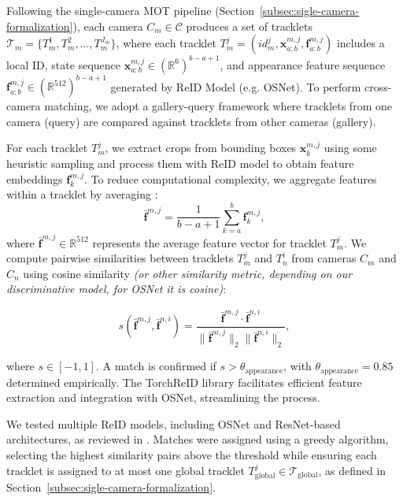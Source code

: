 \documentclass[12pt, a4paper]{article}
\begin{document}
Following the single-camera MOT pipeline (Section~\ref{subsec:sigle-camera-formalization}), each camera $C_m \in \mathcal{C}$ produces a set of tracklets $\mathcal{T}_m = \{ T_m^1, T_m^2, \ldots, T_m^{J_m} \}$, where each tracklet $T_m^j = (id_m^j, \mathbf{x}_{a:b}^{m,j}, \mathbf{f}_{a:b}^{m,j})$ includes a local ID, state sequence $\mathbf{x}_{a:b}^{m,j} \in (\mathbb{R}^6)^{b-a+1}$, and appearance feature sequence $\mathbf{f}_{a:b}^{m,j} \in (\mathbb{R}^{512})^{b-a+1}$ generated by ReID Model (e.g. OSNet). To perform cross-camera matching, we adopt a gallery-query framework where tracklets from one camera (query) are compared against tracklets from other cameras (gallery).

For each tracklet $T_m^j$, we extract crops from bounding boxes $\mathbf{x}_k^{m,j}$ using some heuristic sampling and process them with ReID model to obtain feature embeddings $\mathbf{f}_k^{m,j}$. To reduce computational complexity, we aggregate features within a tracklet by averaging \cite{Specker-ReID}:
\begin{equation}
\bar{\mathbf{f}}^{m,j} = \frac{1}{b-a+1} \sum_{k=a}^b \mathbf{f}_k^{m,j},
\end{equation}
where $\bar{\mathbf{f}}^{m,j} \in \mathbb{R}^{512}$ represents the average feature vector for tracklet $T_m^j$. We compute pairwise similarities between tracklets $T_m^j$ and $T_n^i$ from cameras $C_m$ and $C_n$ using cosine similarity \textit{(or other similarity metric, depending on our discriminative model, for OSNet it is cosine)}:

\begin{equation}
s(\bar{\mathbf{f}}^{m,j}, \bar{\mathbf{f}}^{n,i}) = \frac{\bar{\mathbf{f}}^{m,j} \cdot \bar{\mathbf{f}}^{n,i}}{\|\bar{\mathbf{f}}^{m,j}\|_2 \|\bar{\mathbf{f}}^{n,i}\|_2},
\end{equation}

where $s \in [-1, 1]$. A match is confirmed if $s > \theta_{\text{appearance}}$, with $\theta_{\text{appearance}} = 0.85$ determined empirically. The TorchReID library facilitates efficient feature extraction and integration with OSNet, streamlining the process.

We tested multiple ReID models, including OSNet and ResNet-based architectures, as reviewed in \cite{Specker-ReID}. Matches were assigned using a greedy algorithm, selecting the highest similarity pairs above the threshold while ensuring each tracklet is assigned to at most one global tracklet $T^j_{\text{global}} \in \mathcal{T}_{\text{global}}$, as defined in Section~\ref{subsec:sigle-camera-formalization}.
\end{document}
